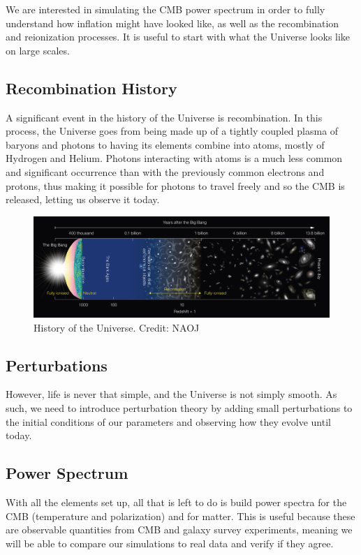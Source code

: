 \documentclass{aa}
\begin{document}
We are interested in simulating the CMB power spectrum in order to fully understand how inflation might have looked like, as well as the recombination and reionization processes. It is useful to start with what the Universe looks like on large scales.

\subsection{Recombination History}

A significant event in the history of the Universe is recombination. In this process, the Universe goes from being made up of a tightly coupled plasma of baryons and photons to having its elements combine into atoms, mostly of Hydrogen and Helium. Photons interacting with atoms is a much less common and significant occurrence than with the previously common electrons and protons, thus making it possible for photons to travel freely and so the CMB is released, letting us observe it today.

\begin{figure}[ht]
\caption{History of the Universe. Credit: NAOJ}             
\label{fig:history}      
\centering          
\includegraphics[width=\textwidth]{report/figures/eso1620a.jpg}
\end{figure}

\subsection{Perturbations}

However, life is never that simple, and the Universe is not simply smooth. As such, we need to introduce perturbation theory by adding small perturbations to the initial conditions of our parameters and observing how they evolve until today.

\subsection{Power Spectrum}

With all the elements set up, all that is left to do is build power spectra for the CMB (temperature and polarization) and for matter. This is useful because these are observable quantities from CMB and galaxy survey experiments, meaning we will be able to compare our simulations to real data and verify if they agree.
\end{document}
